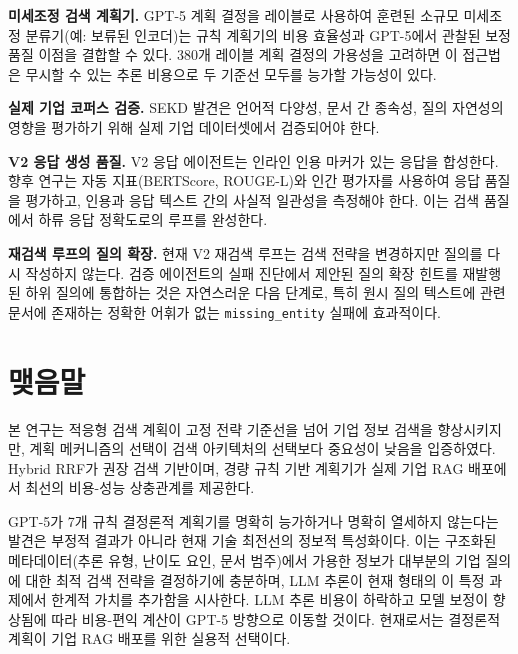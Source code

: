 \textbf{미세조정 검색 계획기.} GPT-5 계획 결정을 레이블로 사용하여 훈련된 소규모 미세조정 분류기(예: 보류된 인코더)는 규칙 계획기의 비용 효율성과 GPT-5에서 관찰된 보정 품질 이점을 결합할 수 있다. 380개 레이블 계획 결정의 가용성을 고려하면 이 접근법은 무시할 수 있는 추론 비용으로 두 기준선 모두를 능가할 가능성이 있다.

\textbf{실제 기업 코퍼스 검증.} SEKD 발견은 언어적 다양성, 문서 간 종속성, 질의 자연성의 영향을 평가하기 위해 실제 기업 데이터셋에서 검증되어야 한다.

\textbf{V2 응답 생성 품질.} V2 응답 에이전트는 인라인 인용 마커가 있는 응답을 합성한다. 향후 연구는 자동 지표(BERTScore, ROUGE-L)와 인간 평가자를 사용하여 응답 품질을 평가하고, 인용과 응답 텍스트 간의 사실적 일관성을 측정해야 한다. 이는 검색 품질에서 하류 응답 정확도로의 루프를 완성한다.

\textbf{재검색 루프의 질의 확장.} 현재 V2 재검색 루프는 검색 전략을 변경하지만 질의를 다시 작성하지 않는다. 검증 에이전트의 실패 진단에서 제안된 질의 확장 힌트를 재발행된 하위 질의에 통합하는 것은 자연스러운 다음 단계로, 특히 원시 질의 텍스트에 관련 문서에 존재하는 정확한 어휘가 없는 \texttt{missing\_entity} 실패에 효과적이다.

\section{맺음말}
\label{sec:conc_closing_ko}

본 연구는 적응형 검색 계획이 고정 전략 기준선을 넘어 기업 정보 검색을 향상시키지만, 계획 메커니즘의 선택이 검색 아키텍처의 선택보다 중요성이 낮음을 입증하였다. Hybrid RRF가 권장 검색 기반이며, 경량 규칙 기반 계획기가 실제 기업 RAG 배포에서 최선의 비용-성능 상충관계를 제공한다.

GPT-5가 7개 규칙 결정론적 계획기를 명확히 능가하거나 명확히 열세하지 않는다는 발견은 부정적 결과가 아니라 현재 기술 최전선의 정보적 특성화이다. 이는 구조화된 메타데이터(추론 유형, 난이도 요인, 문서 범주)에서 가용한 정보가 대부분의 기업 질의에 대한 최적 검색 전략을 결정하기에 충분하며, LLM 추론이 현재 형태의 이 특정 과제에서 한계적 가치를 추가함을 시사한다. LLM 추론 비용이 하락하고 모델 보정이 향상됨에 따라 비용-편익 계산이 GPT-5 방향으로 이동할 것이다. 현재로서는 결정론적 계획이 기업 RAG 배포를 위한 실용적 선택이다.
